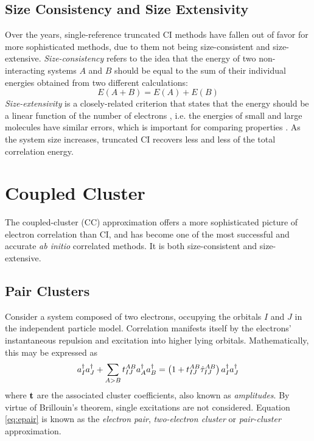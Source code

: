 \subsection{Size Consistency and Size Extensivity}

Over the years, single-reference truncated CI methods have fallen out of favor for more sophisticated methods, due to them not being size-consistent and size-extensive. \emph{Size-consistency} refers to the idea that the energy of two non-interacting systems $A$ and $B$ should be equal to the sum of their individual energies obtained from two different calculations:
\begin{equation}
E(A+B) = E(A) + E(B)
\end{equation}
\noindent \emph{Size-extensivity} is a closely-related criterion that states that the energy should be a linear function of the number of electrons , i.e. the energies of small and large molecules have similar errors, which is important for comparing properties \cite{You2004}. As the system size increases, truncated CI recovers less and less of the total correlation energy.

\section{Coupled Cluster}

The coupled-cluster (CC) approximation offers a more sophisticated picture of electron correlation than CI, and has become one of the most successful and accurate \emph{ab initio} correlated methods. It is both size-consistent and size-extensive.

\subsection{Pair Clusters}

Consider a system composed of two electrons, occupying the orbitals $I$ and $J$ in the independent particle model. Correlation manifests itself by the electrons' instantaneous repulsion and excitation into higher lying orbitals. Mathematically, this may be expressed as
\begin{equation}
a^{\dagger}_I a^{\dagger}_J + \sum_{A > B} t_{IJ}^{AB} a^{\dagger}_A a^{\dagger}_B = \left( 1 + t_{IJ}^{AB} \hat{\tau}_{IJ}^{AB} \right) a^{\dagger}_I  a^{\dagger}_J 
\label{eq:epair}
\end{equation}
\noindent where $\mathbf{t}$ are the associated cluster coefficients, also known as \emph{amplitudes}. By virtue of Brillouin's theorem, single excitations are not considered. Equation \ref{eq:epair} is known as the \emph{electron pair}, \emph{two-electron cluster} or \emph{pair-cluster} approximation. 

